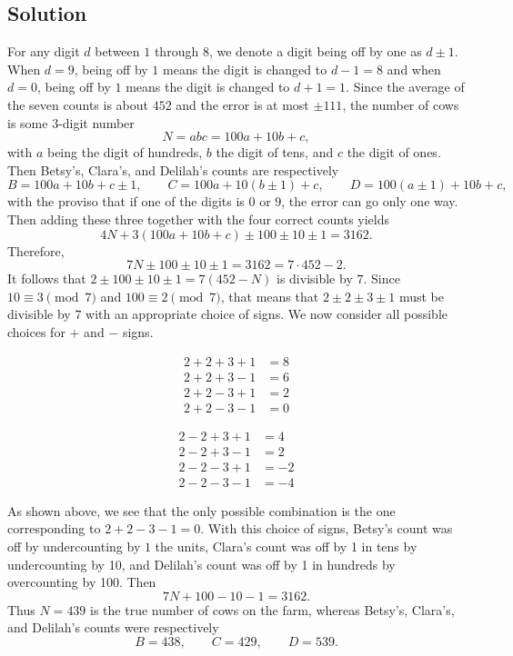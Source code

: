 \documentclass{article}
\begin{document}
\subsection*{Solution}
    For any digit $d$ between $1$ through $8$, we denote a digit being off by one as $d \pm 1$. When $d = 9$, being off by $1$ means the digit is changed to $d - 1 = 8$ and when $d = 0$, being off by $1$ means the digit is changed to $d + 1 = 1$. Since the average of the seven counts is about $452$ and the error is at most $\pm 111$, the number of cows is some $3$-digit number $$N = abc = 100a + 10b + c,$$ with $a$ being the digit of hundreds, $b$ the digit of tens, and $c$ the digit of ones. Then Betsy's, Clara's, and Delilah's counts are respectively $$B = 100a + 10b + c \pm 1,\qquad C = 100a + 10(b \pm 1) + c, \qquad D = 100(a \pm 1) + 10b + c,$$ with the proviso that if one of the digits is $0$ or $9$, the error can go only one way. Then adding these three together with the four correct counts yields $$4N + 3(100a + 10b + c) \pm 100 \pm 10 \pm 1 = 3162.$$ Therefore, $$7N \pm 100 \pm 10 \pm 1 = 3162 = 7 \cdot 452 - 2.$$ It follows that $2 \pm 100 \pm 10 \pm 1 = 7(452 - N)$ is divisible by $7$. Since $10 \equiv 3 \pmod{7}$ and $100 \equiv 2 \pmod{7}$, that means that $2 \pm 2 \pm 3 \pm 1$ must be divisible by $7$ with an appropriate choice of signs. We now consider all possible choices for $+$ and $-$ signs.
    
    \vspace{-7mm}
    \begin{center}
    \begin{minipage}[t]{0.4\textwidth}
        \begin{align*}
            2 + 2 + 3 + 1 &= 8 \\
            2 + 2 + 3 - 1 &= 6 \\
            2 + 2 - 3 + 1 &= 2 \\
            2 + 2 - 3 - 1 &= 0
        \end{align*}
    \end{minipage}
    \begin{minipage}[t]{0.4\textwidth}
        \begin{align*}
            2 - 2 + 3 + 1 &= 4 \\
            2 - 2 + 3 - 1 &= 2 \\
            2 - 2 - 3 + 1 &= -2 \\
            2 - 2 - 3 - 1 &= -4
        \end{align*}
    \end{minipage}
    \end{center}
    As shown above, we see that the only possible combination is the one corresponding to $2 + 2 - 3 - 1 = 0$. With this choice of signs, Betsy's count was off by undercounting by $1$ the units, Clara's count was off by 1 in tens by undercounting by 10, and Delilah's count was off by 1 in hundreds by overcounting by 100. Then $$7N + 100 - 10 - 1 = 3162.$$ Thus $N = 439$ is the true number of cows on the farm, whereas Betsy's, Clara's, and Delilah's counts were respectively $$B = 438, \qquad C = 429, \qquad D = 539.$$
\end{document}
